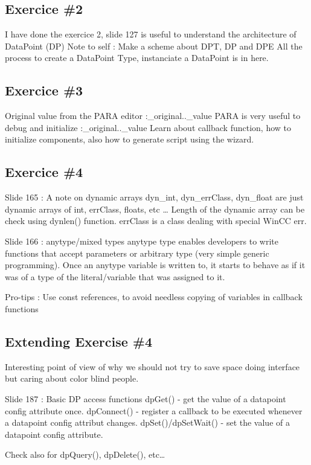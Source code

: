 \documentclass[a4paper, 10pt]{article}
\begin{document}
\subsection{Exercice \#2}
I have done the exercice 2, slide 127 is useful to understand the architecture of DataPoint (DP)
Note to self : Make a scheme about DPT, DP and DPE
All the process to create a DataPoint Type, instanciate a DataPoint is in here.

\subsection{Exercice \#3}
Original value from the PARA editor :\_original..\_value
PARA is very useful to debug and initialize :\_original..\_value
Learn about callback function, how to initialize components, also how to generate script using the wizard.

\subsection{Exercice \#4}

Slide 165 : A note on dynamic arrays
dyn\_int, dyn\_errClass, dyn\_float are just dynamic arrays of int, errClass, floats, etc \dots 
Length of the dynamic array can be check using dynlen() function.
errClass is a class dealing with special WinCC err.

Slide 166 : anytype/mixed types
anytype type enables developers to write functions that accept parameters or arbitrary type (very simple generic programming). Once an anytype variable is written to, it starts to behave as if it was of a type of the literal/variable that was assigned to it.

Pro-tips : Use const references, to avoid needless copying of variables in callback functions

\subsection{Extending Exercise \#4}
Interesting point of view of why we should not try to save space doing interface but caring about color blind people.

Slide 187 : Basic DP access functions
dpGet() - get the value of a datapoint config attribute once.
dpConnect() - register a callback to be executed whenever a datapoint config attribut changes.
dpSet()/dpSetWait() - set the value of a datapoint config attribute.

Check also for dpQuery(), dpDelete(), etc\dots
\end{document}
